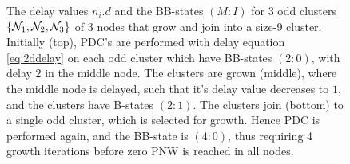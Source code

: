 \begin{figure}
\begin{tikzpicture}[on grid, scale=1]
    \end{tikzpicture}
    \caption{The delay values $n_i.d$ and the BB-states $(M:I)$ for 3 odd clusters $\{\nset_1, \nset_2, \nset_3\}$ of 3 nodes that grow and join into a size-9 cluster. Initially (top), PDC's are performed with delay equation \ref{eq:2ddelay} on each odd cluster which have BB-states $(2:0)$, with delay $2$ in the middle node. The clusters are grown (middle), where the middle node is delayed, such that it's delay value decreases to $1$, and the clusters have B-states $(2:1)$. The clusters join (bottom) to a single odd cluster, which is selected for growth. Hence PDC is performed again, and the BB-state is $(4:0)$, thus requiring 4 growth iterations before zero PNW is reached in all nodes.}\label{fig:kbloom}
\end{figure}

